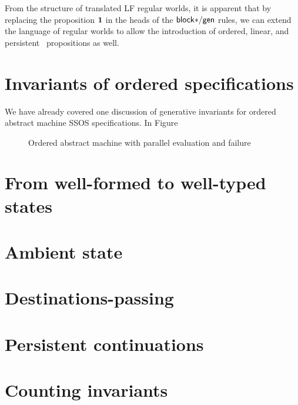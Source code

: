 From the structure of translated LF regular worlds, it is apparent
that by replacing the proposition $\mathbf{1}$ in the heads of the ${\sf
  block{*}/gen}$ rules, we can extend the language of regular worlds to
allow the introduction of ordered, linear, and persistent
\sls~propositions as well.


\section{Invariants of ordered specifications}

We have already covered one discussion of generative invariants for 
ordered abstract machine SSOS specifications. In Figure 

\begin{figure}[t]
\caption{Ordered abstract machine with parallel evaluation and failure}
\label{fig:ssos-fail}
\end{figure}


\section{From well-formed to well-typed states}

\section{Ambient state}




\section{Destinations-passing}
\label{sec:gen-destinations}


\section{Persistent continuations}
\label{sec:gen-letcc}

\section{Counting invariants}



\label{sec:pointer-inequality}
